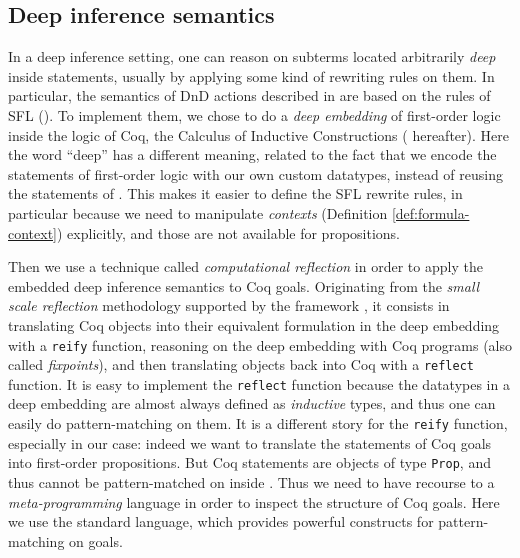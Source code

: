 \subsection{Deep inference semantics}

In a deep inference setting, one can reason on subterms located arbitrarily
\emph{deep} inside statements, usually by applying some kind of rewriting rules
on them. In particular, the semantics of DnD actions described in 
are based on the rules of SFL (). To implement them, we chose to do
a \emph{deep embedding} of first-order logic inside the logic of Coq, the
Calculus of Inductive Constructions ( hereafter). Here the word
``deep'' has a different meaning, related to the fact that we encode the
statements of first-order logic with our own custom datatypes, instead of
reusing the statements of . This makes it easier to define the SFL
rewrite rules, in particular because we need to manipulate \emph{contexts}
(Definition \ref{def:formula-context}) explicitly, and those are not available
for  propositions.

Then we use a technique called \emph{computational reflection} in order to apply
the embedded deep inference semantics to Coq goals. Originating from the
\emph{small scale reflection} methodology supported by the {\ssreflect}
framework \cite{SSR}, it consists in translating Coq objects into their
equivalent formulation in the deep embedding with a \texttt{reify} function,
reasoning on the deep embedding with Coq programs (also called
\emph{fixpoints}), and then translating objects back into Coq with a
\texttt{reflect} function. It is easy to implement the \texttt{reflect} function
because the datatypes in a deep embedding are almost always defined as
\emph{inductive} types, and thus one can easily do pattern-matching on them. It
is a different story for the \texttt{reify} function, especially in our case:
indeed we want to translate the statements of Coq goals into first-order
propositions. But Coq statements are objects of type \texttt{Prop}, and thus
cannot be pattern-matched on inside . Thus we
need to have recourse to a \emph{meta-programming} language in order to inspect
the structure of Coq goals. Here we use the standard {\ltac} language, which
provides powerful constructs for pattern-matching on goals.

